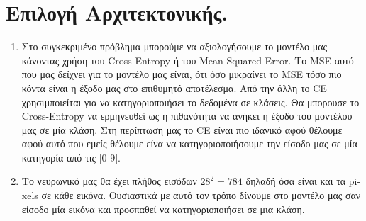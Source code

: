 \documentclass[12pt,a4paper]{article}
\newcommand{\tl}{\textlatin}
\begin{document}
    \section{Επιλογή Αρχιτεκτονικής.}

    \begin{enumerate}
        \item Στο συγκεκριμένο πρόβλημα μπορούμε να αξιολογήσουμε το μοντέλο μας κάνοντας χρήση του \tl{Cross-Entropy} ή του \tl{Mean-Squared-Error}. Το \tl{MSE} αυτό που μας δείχνει για το μοντέλο μας είναι, ότι όσο μικραίνει το \tl{MSE} τόσο πιο κόντα είναι η έξοδο μας στο επιθυμητό αποτέλεσμα. Από την άλλη το \tl{CE} χρησιμποιείται για να κατηγοριοποιήσει το δεδομένα σε κλάσεις. Θα μπορουσε το  \tl{Cross-Entropy} να ερμηνευθεί ως η πιθανότητα να ανήκει η έξοδο του μοντέλου μας σε μία κλάση. Στη περίπτωση μας το \tl{CE} είναι πιο ιδανικό αφού θέλουμε αφού αυτό που εμείς θέλουμε είνα να κατηγοριοποιήσουμε την είσοδο μας σε μία κατηγορία από τις $[0 $-$ 9]$.

        \item Το νευρωνικό μας θα έχει πλήθος εισόδων $ 28^2 = 784 $ δηλαδή όσα είναι και  τα \tl{pixels} σε κάθε εικόνα. Ουσιαστικά με αυτό τον τρόπο δίνουμε στο μοντέλο μας σαν είσοδο μία εικόνα και προσπαθεί να κατηγοριοποιήσει σε μια κλάση. 

    \end{enumerate}
\end{document}
